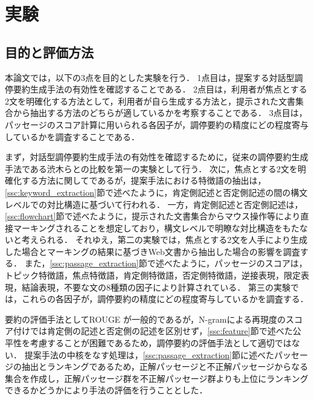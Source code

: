 \documentclass[japanese]{jnlp_1.4}
\begin{document}
\section{実験}
\label{sc:experiment}

\subsection{目的と評価方法}
\label{ssc:evaluation}

本論文では，以下の3点を目的とした実験を行う．
1点目は，提案する対話型調停要約生成手法の有効性を確認することである．
2点目は，利用者が焦点とする2文を明確化する方法として，利用者が自ら生成する方法と，提示された文書集合から抽出する方法のどちらが適しているかを考察することである．
3点目は，パッセージのスコア計算に用いられる各因子が，調停要約の精度にどの程度寄与しているかを調査することである．

まず，対話型調停要約生成手法の有効性を確認するために，従来の調停要約生成手法である渋木ら\cite{Shibuki2011a}との比較を第一の実験として行う．
次に，焦点とする2文を明確化する方法に関してであるが，提案手法における特徴語の抽出は，\ref{ssc:keyword_extraction}節で述べたように，肯定側記述と否定側記述の間の構文レベルでの対比構造に基づいて行われる．
一方，肯定側記述と否定側記述は，\ref{ssc:flowchart}節で述べたように，提示された文書集合からマウス操作等により直接マーキングされることを想定しており，構文レベルで明瞭な対比構造をもたないと考えられる．
それゆえ，第二の実験では，焦点とする2文を人手により生成した場合とマーキングの結果に基づきWeb文書から抽出した場合の影響を調査する．
また，\ref{ssc:passage_extraction}節で述べたように，パッセージのスコアは，トピック特徴語，焦点特徴語，肯定側特徴語，否定側特徴語，逆接表現，限定表現，結論表現，不要な文の8種類の因子により計算されている．
第三の実験では，これらの各因子が，調停要約の精度にどの程度寄与しているかを調査する．


要約の評価手法としてROUGE \cite{Lin2003}が一般的であるが，N-gramによる再現度のスコア付けでは肯定側の記述と否定側の記述を区別せず，\ref{ssc:feature}節で述べた公平性を考慮することが困難であるため，調停要約の評価手法として適切ではない．
提案手法の中核をなす処理は，\ref{ssc:passage_extraction}節に述べたパッセージの抽出とランキングであるため，正解パッセージと不正解パッセージからなる集合を作成し，正解パッセージ群を不正解パッセージ群よりも上位にランキングできるかどうかにより手法の評価を行うこととした．
\end{document}
